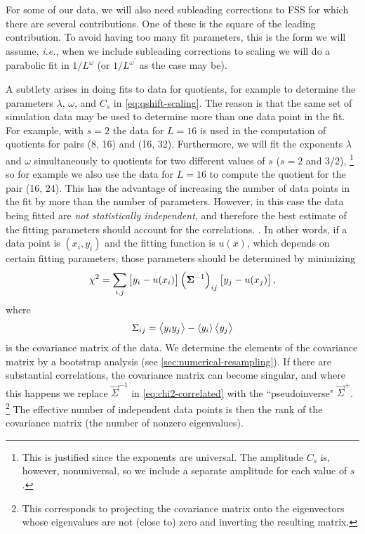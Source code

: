 For some of our data, we will also need subleading corrections to FSS for which
there are several contributions. One of these is the square of the leading
contribution. To avoid having too many fit parameters, this is the form we will
assume, \emph{i.e.}, when we include subleading corrections to scaling we will
do a parabolic fit in $1/L^{\omega}$ (or $1/L^{\omega^{\prime}}$ as the case
may be).

A subtlety arises in doing fits to data for quotients, for example to determine
the parameters $\lambda$, $\omega$, and $C_s$ in \cref{eq:qshift-scaling}. The
reason is that the same set of simulation data may be used to determine more
than one data point in the fit. For example, with $s=2$ the data for $L=16$ is
used in the computation of quotients for pairs (8, 16) and (16, 32).
Furthermore, we will fit the exponents $\lambda$ and $\omega$ simultaneously to
quotients for two different values of $s$ ($s=2$ and 3/2),%
\footnote{%
  This is justified since the exponents are universal. The amplitude $C_s$ is,
  however, nonuniversal, so we include a separate amplitude for each value of
  $s$.
}
so for example we also use the data for $L=16$ to compute the quotient for the
pair (16, 24). This has the advantage of increasing the number of data points
in the fit by more than the number of parameters. However, in this case the
data being fitted are \emph{not statistically independent}, and therefore the
best estimate of the fitting parameters should account for the correlations.
\autocite{ballesteros1996finite,ballesteros1998critical,weigel2009cross}. In
other words, if a data point is $(x_i,y_i)$ and the fitting function is $u(x)$,
which depends on certain fitting parameters, those parameters should be
determined by minimizing
\begin{equation}
  \chi^2 = \sum_{i,j}
  \left[y_i - u(x_i)\right]
  \left(\bm{\Sigma}^{-1}\right)_{ij}
  \left[y_j - u(x_j)\right],
  \label{eq:chi2-correlated}
\end{equation}
where
\begin{equation}
  \Sigma_{ij} = \left< y_i y_j \right> - \left< y_i \right>\left< y_j \right>
\end{equation}
is the covariance matrix of the data. We determine the elements of the
covariance matrix by a bootstrap analysis (see
\cref{sec:numerical-resampling}). If there are substantial correlations, the
covariance matrix can become singular, and where this happens we replace
$\vec{\Sigma}^{-1}$ in \cref{eq:chi2-correlated} with the ``pseudoinverse"
$\vec{\Sigma}^+$.%
\footnote{%
  This corresponds to projecting the covariance matrix onto the eigenvectors
  whose eigenvalues are not (close to) zero and inverting the resulting matrix.
}
The effective number of independent data points is then the rank of the
covariance matrix (the number of nonzero eigenvalues).


